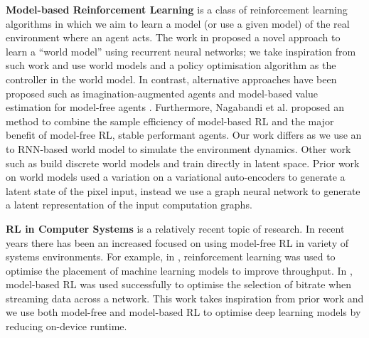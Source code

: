 

\textbf{Model-based Reinforcement Learning} is a class of reinforcement learning algorithms in which we aim to learn a model (or use a given model) of the real environment where an agent acts. The work in \cite{ha2018worldmodels} proposed a novel approach to learn a ``world model'' using recurrent neural networks; we take inspiration from such work and use world models and a policy optimisation algorithm as the controller in the world model. In contrast, alternative approaches have been proposed such as imagination-augmented agents \cite{weber2018imaginationaugmented} and model-based value estimation for model-free agents \cite{feinberg2018modelbased}. Furthermore, Nagabandi et al. \cite{nagabandi2017neural} proposed an method to combine the sample efficiency of model-based RL and the major benefit of model-free RL, stable performant agents. Our work differs as we use an to RNN-based world model to simulate the environment dynamics. Other work such as \cite{robine2021smaller, hafner2021mastering} build discrete world models and train directly in latent space. Prior work on world models used a variation on a variational auto-encoders \cite{ha2018worldmodels,hafner2020dream} to generate a latent state of the pixel input, instead we use a graph neural network \cite{battaglia2018relational} to generate a latent representation of the input computation graphs.

\textbf{RL in Computer Systems} is a relatively recent topic of research. In recent years there has been an increased focused on using model-free RL in variety of systems environments. For example, in \cite{mirhoseini2017device, mirhoseini2018hierarchical, addanki2019placeto, paliwal2020reinforced}, reinforcement learning was used to optimise the placement of machine learning models to improve throughput. In \cite{app10196685}, model-based RL was used successfully to optimise the selection of bitrate when streaming data across a network. This work takes inspiration from prior work and we use both model-free and model-based RL to optimise deep learning models by reducing on-device runtime.

